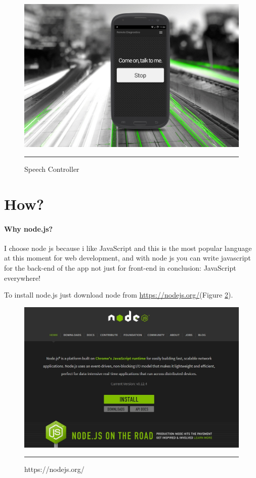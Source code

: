 \begin{figure}[h!]
  \centering
    \includegraphics[width=1\textwidth]{./Pictures/speech_controller.jpg}
  \rule{1\textwidth}{1pt}
 \caption{Speech Controller}
  \label{fig:speech_controller}
\end{figure}

\newpage
\clearpage
\section{How?}
\paragraph*{Why node.js?}
I choose node js because i like JavaScript and this is the most popular language at this moment for web development, and with node js you can write javascript for the back-end of the app not just for front-end in conclusion: JavaScript everywhere!



To install node.js just download node from \url{ https://nodejs.org/}(Figure \ref{fig:nodejsorg}).

\begin{figure}[h!]
  \centering
    \includegraphics[width=1\textwidth]{./Pictures/nodejsorg.jpg}
  \rule{1\textwidth}{1pt}
 \caption{https://nodejs.org/}
  \label{fig:nodejsorg}
\end{figure}

